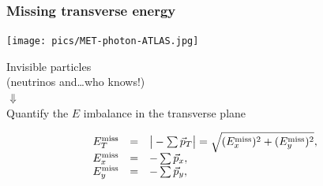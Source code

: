 \begin{frame}\frametitle{Missing transverse energy}
\centering\myskip


\begin{minipage}{.6\textwidth}\centering
\texttt{[image: pics/MET-photon-ATLAS.jpg]}\\

\end{minipage}\begin{minipage}{.4\textwidth}\centering

Invisible particles\\
{\footnotesize (neutrinos and\dots who knows!)}\\
{\Large$\Downarrow$}\\
Quantify the $E$ imbalance in the transverse plane

\end{minipage}

$$\begin{array}{lcl}
E^{\rm miss}_{T} & = & \big|-\sum\vec{p}_T \big| = \sqrt{(E^{\rm miss}_{x})^2 + (E^{\rm miss}_{y})^2} ,\\
E^{\rm miss}_{x} & = & -\sum\vec{p}_x ,\\
E^{\rm miss}_{y} & = & -\sum\vec{p}_y ,\\
\end{array}$$



\end{frame}

